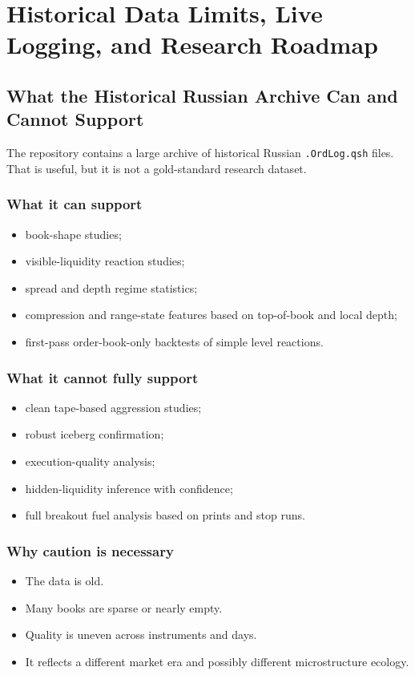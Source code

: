 \section{Historical Data Limits, Live Logging, and Research Roadmap}

\subsection{What the Historical Russian Archive Can and Cannot Support}

The repository contains a large archive of historical Russian \texttt{.OrdLog.qsh} files.
That is useful, but it is not a gold-standard research dataset.

\subsubsection{What it can support}
\begin{itemize}
  \item book-shape studies;
  \item visible-liquidity reaction studies;
  \item spread and depth regime statistics;
  \item compression and range-state features based on top-of-book and local depth;
  \item first-pass order-book-only backtests of simple level reactions.
\end{itemize}

\subsubsection{What it cannot fully support}
\begin{itemize}
  \item clean tape-based aggression studies;
  \item robust iceberg confirmation;
  \item execution-quality analysis;
  \item hidden-liquidity inference with confidence;
  \item full breakout fuel analysis based on prints and stop runs.
\end{itemize}

\subsubsection{Why caution is necessary}
\begin{itemize}
  \item The data is old.
  \item Many books are sparse or nearly empty.
  \item Quality is uneven across instruments and days.
  \item It reflects a different market era and possibly different microstructure ecology.
\end{itemize}


